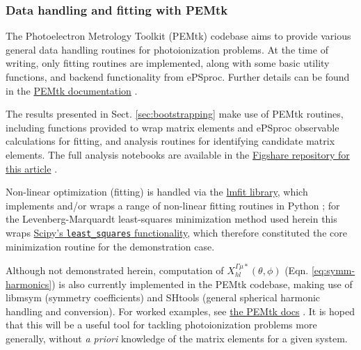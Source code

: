 \documentclass[10pt]{article}
\begin{document}
\subsubsection{Data handling and fitting with PEMtk}

The Photoelectron Metrology Toolkit (PEMtk) codebase \cite{hockett2021PEMtkDocs, hockett2021PEMtkGithub} aims to provide various general data handling routines for photoionization problems. At the time of writing, only fitting routines are implemented, along with some basic utility functions, and backend functionality from ePSproc. Further details can be found in the \href{https://pemtk.readthedocs.io/en/latest/about.html}{PEMtk documentation} \cite{hockett2021PEMtkDocs}.

The results presented in Sect. \ref{sec:bootstrapping} make use of PEMtk routines, including functions provided to wrap matrix elements and ePSproc observable calculations for fitting, and analysis routines for identifying candidate matrix elements. The full analysis notebooks are available in the \href{http://dx.doi.org/10.6084/m9.figshare.20293782}{Figshare repository for this article} \cite{hockett2022MFreconFigshare}.

Non-linear optimization (fitting) is handled via the \href{https://lmfit.github.io/lmfit-py/index.html}{lmfit library}, which implements and/or wraps a range of non-linear fitting routines in Python \cite{LMFITDocumentation, newville2014LMFITNonLinearLeastSquare}; for the Levenberg-Marquardt least-squares minimization method used herein this wraps 
\href{https://docs.scipy.org/doc/scipy/reference/generated/scipy.optimize.least_squares.html}{Scipy's \texttt{least\_squares} functionality}, which therefore constituted the core minimization routine \cite{SciPyDocumentation} for the demonstration case.

Although not demonstrated herein, computation of $X_{hl}^{\Gamma\mu*}(\theta,\phi)$ (Eqn. \ref{eq:symm-harmonics}) is also currently implemented in the PEMtk codebase, making use of libmsym \cite{johansson2017AutomaticProcedureGeneratinga, johansson2022LibmsymGithub} (symmetry coefficients) and SHtools \cite{wieczorek2018SHToolsToolsWorking,SHtoolsGithub} (general spherical harmonic handling and conversion). For worked examples, see \href{https://pemtk.readthedocs.io/en/latest/sym/pemtk_symHarm_demo_160322_tidy.html}{the PEMtk docs} \cite{hockett2021PEMtkDocs}. It is hoped that this will be a useful tool for tackling photoionization problems more generally, without \textit{a priori} knowledge of the matrix elements for a given system.


\printbibliography[heading=bibintoc]
\end{document}
